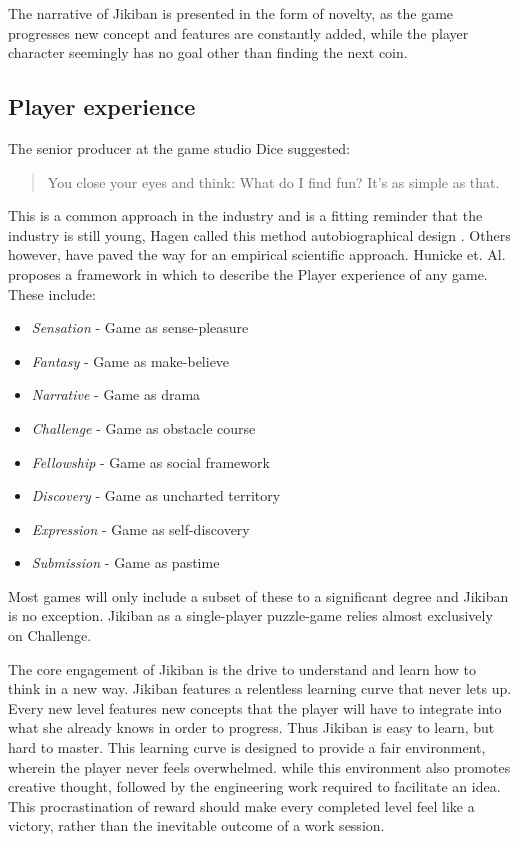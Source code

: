 The narrative of Jikiban is presented in the form of novelty, as the
game progresses new concept and features are constantly added, while
the player character seemingly has no goal other than finding the next
coin.

\subsection{Player experience}
The senior producer at the game studio Dice suggested\cite{hagen10}:

\begin{quotation}
You close your eyes and think: What do I find fun? It’s as simple as that.
\end{quotation}

This is a common approach in the industry and is a fitting reminder
that the industry is still young, Hagen called this method
autobiographical design \cite{hagen10}. Others however, have paved the
way for an empirical scientific approach. Hunicke et. Al.  proposes a
framework in which to describe the Player experience of any
game\cite{hunicke01-04}. These include:

\begin{itemize}
\item \emph{Sensation} - Game as sense-pleasure
\item \emph{Fantasy} - Game as make-believe
\item \emph{Narrative} - Game as drama
\item \emph{Challenge} - Game as obstacle course

\item \emph{Fellowship} %
 - Game as social framework %
\item \emph{Discovery} - Game as uncharted territory
\item \emph{Expression} - Game as self-discovery
\item \emph{Submission} - Game as pastime
\end{itemize}

Most games will only include a subset of these to a significant degree
and Jikiban is no exception. Jikiban as a single-player puzzle-game
relies almost exclusively on Challenge.

The core engagement of Jikiban is the drive to understand and learn
how to think in a new way. Jikiban features a relentless learning
curve that never lets up. Every new level features new concepts that
the player will have to integrate into what she already knows in order
to progress. Thus Jikiban is easy to learn, but hard to master. This 
learning curve is designed to provide a fair environment, wherein
the player never feels overwhelmed. while this environment also promotes 
creative thought, followed by the engineering work required to facilitate 
an idea. This procrastination of reward should make every completed level 
feel like a victory, rather than the inevitable outcome of a work session.

